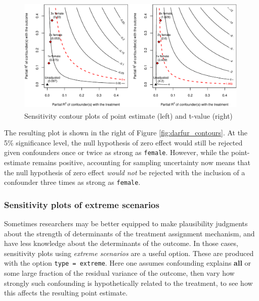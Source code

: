 \documentclass[
]{jss}
\begin{document}
\begin{CodeChunk}
\begin{figure}[!tp]

{\centering \includegraphics[width=420px,height=210px]{jss_sensemakr_files/figure-latex/both_plots_real-1} 

}

\caption{\label{fig:darfur_contours}Sensitivity contour plots of point estimate (left) and t-value (right)}\label{fig:both_plots_real}
\end{figure}
\end{CodeChunk}

The resulting plot is shown in the right of Figure
\ref{fig:darfur_contours}. At the 5\% significance level, the null
hypothesis of zero effect would still be rejected given confounders once
or twice as strong as \texttt{female}. However, while the point-estimate
remains positive, accounting for sampling uncertainty now means that the
null hypothesis of zero effect \emph{would not} be rejected with the
inclusion of a confounder three times as strong as \texttt{female}.

\hypertarget{sensitivity-plots-of-extreme-scenarios}{%
\subsubsection{Sensitivity plots of extreme
scenarios}\label{sensitivity-plots-of-extreme-scenarios}}

Sometimes researchers may be better equipped to make plausibility
judgments about the strength of determinants of the treatment assignment
mechanism, and have less knowledge about the determinants of the
outcome. In those cases, sensitivity plots using \emph{extreme
scenarios} are a useful option. These are produced with the option
\texttt{type\ =\ extreme}. Here one assumes confounding explains
\textbf{all} or some large fraction of the residual variance of the
outcome, then vary how strongly such confounding is hypothetically
related to the treatment, to see how this affects the resulting point
estimate.
\end{document}
